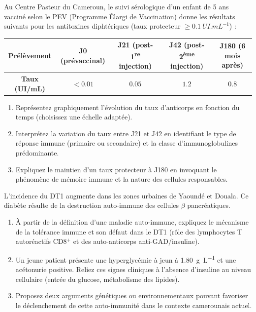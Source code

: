 \documentclass[11pt]{article}
\begin{document}
\begin{exercice}
Au Centre Pasteur du Cameroun, le suivi sérologique d'un enfant de 5 ans vacciné selon le PEV (Programme Élargi de Vaccination) donne les résultats suivants pour les antitoxines diphtériques (taux protecteur $\ge \SI{0.1}{UI.mL^{-1}}$) :

\begin{center}
\begin{tabular}{|c|c|c|c|c|}
\hline
\textbf{Prélèvement} & \textbf{J0 (prévaccinal)} & \textbf{J21 (post-1\textsuperscript{re} injection)} & \textbf{J42 (post-2\textsuperscript{ème} injection)} & \textbf{J180 (6 mois après)} \\
\hline
\textbf{Taux (UI/mL)} & $< 0.01$ & $0.05$ & $1.2$ & $0.8$ \\
\hline
\end{tabular}
\end{center}

\begin{enumerate}
    \item Représentez graphiquement l'évolution du taux d'anticorps en fonction du temps (choisissez une échelle adaptée).
    \item Interprétez la variation du taux entre J21 et J42 en identifiant le type de réponse immune (primaire ou secondaire) et la classe d'immunoglobulines prédominante.
    \item Expliquez le maintien d'un taux protecteur à J180 en invoquant le phénomène de mémoire immune et la nature des cellules responsables.
\end{enumerate}
\end{exercice}

\begin{exercice}
L'incidence du DT1 augmente dans les zones urbaines de Yaoundé et Douala. Ce diabète résulte de la destruction auto-immune des cellules $\beta$ pancréatiques.
\begin{enumerate}
    \item À partir de la définition d'une maladie auto-immune, expliquez le mécanisme de la tolérance immune et son défaut dans le DT1 (rôle des lymphocytes T autoréactifs CD8$^+$ et des auto-anticorps anti-GAD/insuline).
    \item Un jeune patient présente une hyperglycémie à jeun à \SI{1.80}{g.L^{-1}} et une acétonurie positive. Reliez ces signes cliniques à l'absence d'insuline au niveau cellulaire (entrée du glucose, métabolisme des lipides).
    \item Proposez deux arguments génétiques ou environnementaux pouvant favoriser le déclenchement de cette auto-immunité dans le contexte camerounais actuel.
\end{enumerate}
\end{exercice}
\end{document}
